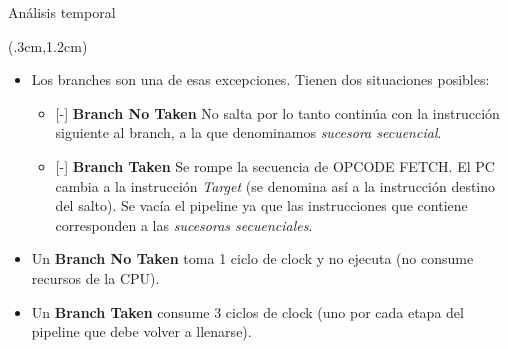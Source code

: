 \documentclass[usenames,table,dvipsnames,aspectratio=169]{beamer}
\begin{document}
\begin{frame}{Análisis temporal}
 \begin{textblock*}{\textwidth}(.3cm,1.2cm) 
  \begin{itemize}[<+(1)->] \justifying \parskip .2cm
   \item Los branches son una de esas excepciones. Tienen dos situaciones posibles:
   \begin{itemize} \justifying \parskip .2cm
    \item {\color{blue}[-] \textbf{Branch No Taken}} No salta por lo tanto continúa con la instrucción siguiente al branch, a la que denominamos \textit{\color{blue}sucesora secuencial}. 
    \item {\color{blue}[-] \textbf{Branch Taken}} Se rompe la secuencia de OPCODE FETCH. El PC cambia a la instrucción \textit{\color {blue}Target} (se denomina así a la instrucción destino del salto). Se vacía el pipeline ya que las instrucciones que contiene corresponden a las \textit{\color{blue}sucesoras secuenciales}.
   \end{itemize}
   \item Un \textbf{\color{blue}Branch No Taken} toma 1 ciclo de clock y no ejecuta (no consume recursos de la CPU). 
   \item Un \textbf{\color{blue}Branch Taken} consume 3 ciclos de clock (uno por cada etapa del pipeline que debe volver a llenarse). 
  \end{itemize}
 \end{textblock*}
\end{frame}
\end{document}
